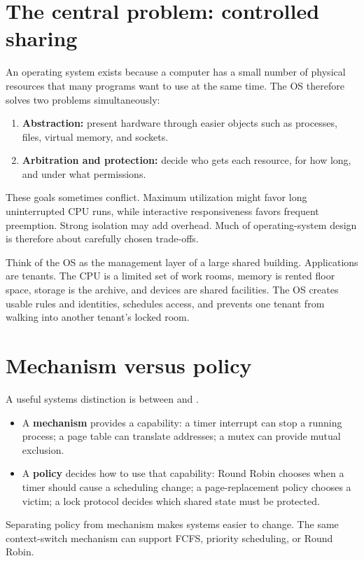 \section{The central problem: controlled sharing}
An operating system exists because a computer has a small number of physical resources that many programs want to use at the same time. The OS therefore solves two problems simultaneously:
\begin{enumerate}
  \item \textbf{Abstraction:} present hardware through easier objects such as processes, files, virtual memory, and sockets.
  \item \textbf{Arbitration and protection:} decide who gets each resource, for how long, and under what permissions.
\end{enumerate}
These goals sometimes conflict. Maximum utilization might favor long uninterrupted CPU runs, while interactive responsiveness favors frequent preemption. Strong isolation may add overhead. Much of operating-system design is therefore about carefully chosen trade-offs.

\begin{analogy}
Think of the OS as the management layer of a large shared building. Applications are tenants. The CPU is a limited set of work rooms, memory is rented floor space, storage is the archive, and devices are shared facilities. The OS creates usable rules and identities, schedules access, and prevents one tenant from walking into another tenant's locked room.
\end{analogy}

\section{Mechanism versus policy}
A useful systems distinction is between  and .
\begin{itemize}
  \item A \textbf{mechanism} provides a capability: a timer interrupt can stop a running process; a page table can translate addresses; a mutex can provide mutual exclusion.
  \item A \textbf{policy} decides how to use that capability: Round Robin chooses when a timer should cause a scheduling change; a page-replacement policy chooses a victim; a lock protocol decides which shared state must be protected.
\end{itemize}
Separating policy from mechanism makes systems easier to change. The same context-switch mechanism can support FCFS, priority scheduling, or Round Robin.

